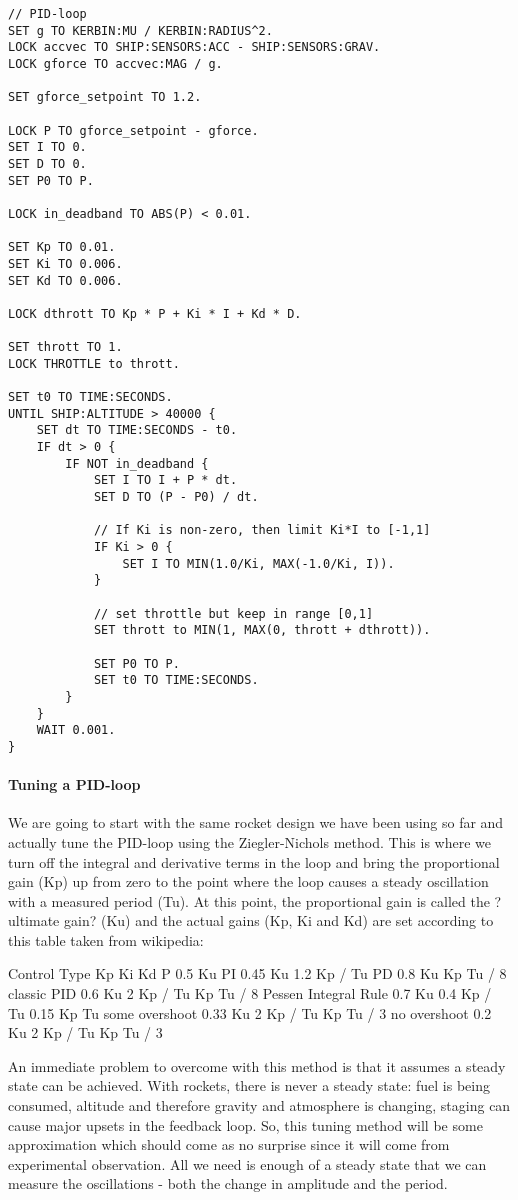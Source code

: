 \begin{Verbatim}[frame=single]
// PID-loop
SET g TO KERBIN:MU / KERBIN:RADIUS^2.
LOCK accvec TO SHIP:SENSORS:ACC - SHIP:SENSORS:GRAV.
LOCK gforce TO accvec:MAG / g.

SET gforce_setpoint TO 1.2.

LOCK P TO gforce_setpoint - gforce.
SET I TO 0.
SET D TO 0.
SET P0 TO P.

LOCK in_deadband TO ABS(P) < 0.01.

SET Kp TO 0.01.
SET Ki TO 0.006.
SET Kd TO 0.006.

LOCK dthrott TO Kp * P + Ki * I + Kd * D.

SET thrott TO 1.
LOCK THROTTLE to thrott.

SET t0 TO TIME:SECONDS.
UNTIL SHIP:ALTITUDE > 40000 {
    SET dt TO TIME:SECONDS - t0.
    IF dt > 0 {
        IF NOT in_deadband {
            SET I TO I + P * dt.
            SET D TO (P - P0) / dt.

            // If Ki is non-zero, then limit Ki*I to [-1,1]
            IF Ki > 0 {
                SET I TO MIN(1.0/Ki, MAX(-1.0/Ki, I)).
            }

            // set throttle but keep in range [0,1]
            SET thrott to MIN(1, MAX(0, thrott + dthrott)).

            SET P0 TO P.
            SET t0 TO TIME:SECONDS.
        }
    }
    WAIT 0.001.
}
\end{Verbatim} 

\paragraph{Tuning a PID-loop}
We are going to start with the same rocket design we have been using so far and actually tune the PID-loop using the Ziegler-Nichols method. This is where we turn off the integral and derivative terms in the loop and bring the proportional gain (Kp) up from zero to the point where the loop causes a steady oscillation with a measured period (Tu). At this point, the proportional gain is called the ?ultimate gain? (Ku) and the actual gains (Kp, Ki and Kd) are set according to this table taken from wikipedia:

Control Type	Kp	Ki	Kd
P	0.5 Ku	 	 
PI	0.45 Ku	1.2 Kp / Tu	 
PD	0.8 Ku	 	Kp Tu / 8
classic PID	0.6 Ku	2 Kp / Tu	Kp Tu / 8
Pessen Integral Rule	0.7 Ku	0.4 Kp / Tu	0.15 Kp Tu
some overshoot	0.33 Ku	2 Kp / Tu	Kp Tu / 3
no overshoot	0.2 Ku	2 Kp / Tu	Kp Tu / 3

An immediate problem to overcome with this method is that it assumes a steady state can be achieved. With rockets, there is never a steady state: fuel is being consumed, altitude and therefore gravity and atmosphere is changing, staging can cause major upsets in the feedback loop. So, this tuning method will be some approximation which should come as no surprise since it will come from experimental observation. All we need is enough of a steady state that we can measure the oscillations - both the change in amplitude and the period.

